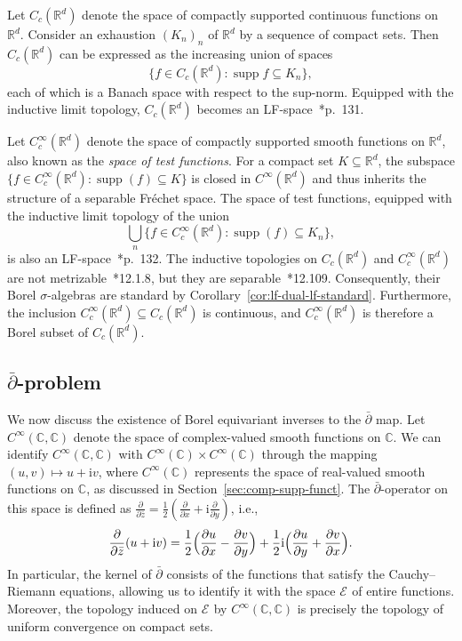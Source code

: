 \documentclass[12pt]{paper}
\numberwithin{equation}{section}
\theoremstyle{plain}
\theoremstyle{definition}
\newcommand{\C}{\mathbb{C}}
\newcommand{\Rd}{\mathbb{R}^{d}}
\newcommand{\im}{\mathrm{i}} %
\newcommand{\contcs}[1]{C_{c}(#1)}
\newcommand{\smooth}[2][]{C^{\infty}_{#1}(#2)}
\newcommand{\smoothcs}[1]{C^{\infty}_{c}(#1)}
\newcommand{\smoothCC}{\smooth{\C,\C}}
\newcommand{\holom}[1][]{\mathcal{E}_{#1}}
\DeclareMathOperator*{\supp}{\mathrm{supp}}
\begin{document}
Let \(\contcs{\Rd}\) denote the space of compactly supported continuous functions on~\(\Rd\).
Consider an exhaustion \((K_{n})_{n}\) of \(\Rd\) by a sequence of compact sets. Then
\(\contcs{\Rd}\) can be expressed as the increasing union of spaces
\[\{f \in \contcs{\Rd} : \supp f \subseteq K_{n}\},\]
each of which is a Banach space with respect to the sup-norm. Equipped with the inductive limit
topology, \(\contcs{\Rd}\) becomes an LF-space~\cite{trevesTopologicalVectorSpaces2006}*{p.~131}.

Let \(\smoothcs{\Rd}\) denote the space of compactly supported smooth functions on \(\Rd\), also
known as the \emph{space of test functions}.  For a compact set \(K \subseteq \Rd\), the subspace
\(\{ f \in \smoothcs{\Rd} : \supp (f) \subseteq K\}\) is closed in \(\smooth{\Rd}\) and thus
inherits the structure of a separable Fr\'echet space.  The space of test functions, equipped with
the inductive limit topology of the union
\[
\bigcup_{n}\{f \in \smoothcs{\Rd} : \supp(f) \subseteq K_{n}\},
\]
is also an LF-space~\cite{trevesTopologicalVectorSpaces2006}*{p.~132}.  The inductive topologies on
\(\contcs{\Rd}\) and \(\smoothcs{\Rd}\) are not
metrizable~\cite{nariciTopologicalVectorSpaces2010}*{12.1.8}, but they are
separable~\cite{nariciTopologicalVectorSpaces2010}*{12.109}. Consequently, their Borel
\(\sigma\)-algebras are standard by Corollary~\ref{cor:lf-dual-lf-standard}.  Furthermore, the
inclusion \(\smoothcs{\Rd} \subseteq \contcs{\Rd}\) is continuous, and \(\smoothcs{\Rd}\) is
therefore a Borel subset of \(\contcs{\Rd}\).

\subsection[d-bar problem]{\texorpdfstring{\(\bar{\partial}\)-problem}{d-bar problem}}
\label{sec:d-bar-problem}

We now discuss the existence of Borel equivariant inverses to the \(\bar{\partial}\) map.  Let
\(\smoothCC\) denote the space of complex-valued smooth functions on \(\C\).  We can identify
\(\smoothCC\) with \(\smooth{\C} \times \smooth{\C}\) through the mapping
\((u,v) \mapsto u + \im v\), where \(\smooth{\C}\) represents the space of real-valued smooth
functions on \(\C\), as discussed in Section~\ref{sec:comp-supp-funct}.  The
\(\bar{\partial}\)-operator on this space is defined as
\(\frac{\partial}{\partial \bar{z}} = \frac{1}{2}(\frac{\partial}{\partial x} + \im
\frac{\partial}{\partial y})\), i.e.,
\[\frac{\partial}{\partial \bar{z}}(u + \im v) = \frac{1}{2}\Bigl(\frac{\partial u}{\partial x} -
  \frac{\partial v}{\partial y}\Bigr) + \frac{1}{2}\im \Bigl(\frac{\partial u}{\partial y} +
  \frac{\partial v}{\partial x}\Bigr).\]
In particular, the kernel of \(\bar{\partial}\) consists of the functions that satisfy the
Cauchy--Riemann equations, allowing us to identify it with the space \(\holom\) of entire functions.
Moreover, the topology induced on \(\holom\) by \(\smoothCC\) is precisely the topology of uniform
convergence on compact sets.
\end{document}
